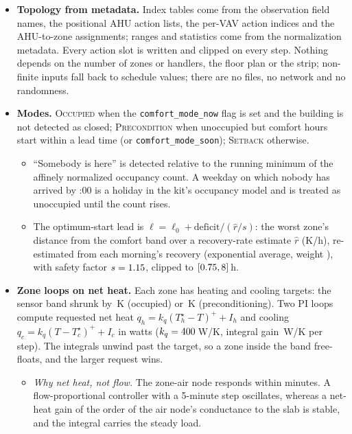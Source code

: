 \documentclass{article}
\begin{document}
\begin{itemize}
\item \textbf{Topology from metadata.} Index tables come from the observation field names, the positional AHU action lists, the per-VAV action indices and the AHU-to-zone assignments; ranges and statistics come from the normalization metadata. Every action slot is written and clipped on every step. Nothing depends on the number of zones or handlers, the floor plan or the strip; non-finite inputs fall back to schedule values; there are no files, no network and no randomness.
\item \textbf{Modes.} \textsc{Occupied} when the \texttt{comfort\_mode\_now} flag is set and the building is not detected as closed; \textsc{Precondition} when unoccupied but comfort hours start within a lead time (or \texttt{comfort\_mode\_soon}); \textsc{Setback} otherwise.
  \begin{itemize}
  \item ``Somebody is here'' is detected relative to the running minimum of the affinely normalized occupancy count. A weekday on which nobody has arrived by \ParHolidayCheckH{}:00 is a holiday in the kit's occupancy model and is treated as unoccupied until the count rises.
  \item The optimum-start lead is $\ell = \ell_0 + \text{deficit}/(\hat{r}/s)$: the worst zone's distance from the comfort band over a recovery-rate estimate $\hat{r}$ (K/h), re-estimated from each morning's recovery (exponential average, weight \ParRateEma), with safety factor $s=1.15$, clipped to $[0.75, 8]$\,h.
  \end{itemize}
\item \textbf{Zone loops on net heat.} Each zone has heating and cooling targets: the sensor band shrunk by \ParMarginOcc\,K (occupied) or \ParMarginPre\,K (preconditioning). Two PI loops compute requested net heat $q_h = k_q (T_h^\star - T)^+ + I_h$ and cooling $q_c = k_q (T - T_c^\star)^+ + I_c$ in watts ($k_q = 400$\,W/K, integral gain \ParKiWPerKStep\,W/K per step). The integrals unwind past the target, so a zone inside the band free-floats, and the larger request wins.
  \begin{itemize}
  \item \emph{Why net heat, not flow.} The zone-air node responds within minutes. A flow-proportional controller with a 5-minute step oscillates, whereas a net-heat gain of the order of the air node's conductance to the slab is stable, and the integral carries the steady load.

\end{itemize}
\end{itemize}
\end{document}
